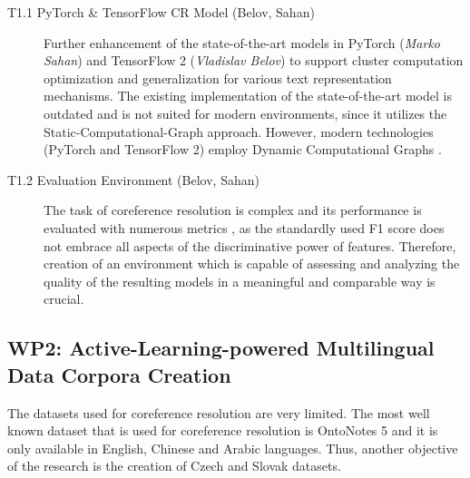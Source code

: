 %
%
%
%


\begin{description}
	\item [T1.1 PyTorch \& TensorFlow CR Model (Belov, Sahan)] Further enhancement of the state-of-the-art models in PyTorch (\textit{Marko Sahan}) and TensorFlow 2 (\textit{Vladislav Belov}) to support cluster computation optimization and generalization for various text representation mechanisms. The existing implementation of the state-of-the-art model is outdated and is not suited for modern environments, since it utilizes the Static-Computational-Graph approach. However, modern technologies (PyTorch and TensorFlow 2) employ Dynamic Computational Graphs \cite{computationalgraph-Neubig2017}.  
	\item [T1.2 Evaluation Environment (Belov, Sahan)] The task of coreference resolution is complex and its performance is evaluated with numerous metrics \cite{muc-Vilain1995,b3-Bagga1998,ceaf-Luo2005}, as the standardly used F1 score \cite{f1-Chen2006} does not embrace all aspects of the discriminative power of features. Therefore, creation of an environment which is capable of assessing and analyzing the quality of the resulting models in a meaningful and comparable way is crucial.
\end{description}


\subsection*{WP2: Active-Learning-powered Multilingual Data Corpora Creation}

 The datasets used for coreference resolution are very limited. The most well known dataset that is used for coreference resolution is OntoNotes 5 \cite{ontonotes5-Weischedel2013} and it is only available in English, Chinese and Arabic languages. Thus, another objective of the research is the creation of Czech and Slovak datasets.

